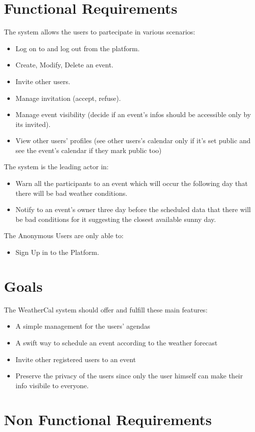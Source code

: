 \section{Functional Requirements}
The system allows the users to partecipate in various scenarios:
\begin{itemize}
\item Log on to and log out from the platform.
\item Create, Modify, Delete an event.
\item Invite other users.
\item Manage invitation (accept, refuse).
\item Manage event visibility (decide if an event's infos should be accessible only by its invited). 
\item View other users' profiles (see other users's calendar only if it's set public and see the event's calendar if they mark public too)
\end{itemize}
The system is the leading actor in:
\begin{itemize}
\item {Warn all the participants to an event which will occur the following day that there will be bad weather conditions.} 
\item Notify to an event's owner three day before the scheduled data that there will be bad conditions for it suggesting the closest available sunny day.
\end{itemize}
The Anonymous Users are only able to:
\begin{itemize}
\item Sign Up in to the Platform.
\end{itemize}
\section {Goals}
The WeatherCal system should offer and fulfill these main features:
\begin{itemize}
\item A simple management for the users' agendas
\item A swift way to schedule an event according to the weather forecast 
\item Invite other registered users to an event
\item Preserve the privacy of the users since only the user himself can make their info visibile to everyone.
\end{itemize}
\section{Non Functional Requirements}
